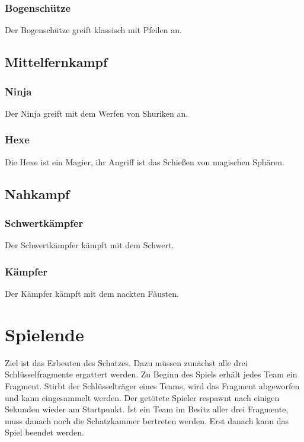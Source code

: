 \documentclass[10pt,a4paper,notitlepage]{scrreprt}
\begin{document}
\begin{flushleft}
\subsubsection{Bogenschütze}
Der Bogenschütze greift klassisch mit Pfeilen an.\\

\subsection{Mittelfernkampf}

\subsubsection{Ninja}
Der Ninja greift mit dem Werfen von Shuriken an.\\

\subsubsection{Hexe}
Die Hexe ist ein Magier, ihr Angriff ist das Schießen von magischen Sphären.\\

\subsection{Nahkampf}

\subsubsection{Schwertkämpfer}
Der Schwertkämpfer kämpft mit dem Schwert.\\

\subsubsection{Kämpfer}
Der Kämpfer kämpft mit dem nackten Fäusten.\\

\section{Spielende}
Ziel ist das Erbeuten des Schatzes. Dazu müssen zunächst alle drei Schlüsselfragmente ergattert werden. Zu Beginn des Spiels erhält jedes Team ein Fragment. Stirbt der Schlüsselträger eines Teams, wird das Fragment abgeworfen und kann eingesammelt werden. Der getötete Spieler respawnt nach einigen Sekunden wieder am Startpunkt. Ist ein Team im Besitz aller drei Fragmente, muss danach noch die Schatzkammer bertreten werden. Erst danach kann das Spiel beendet werden.\\


\end{flushleft}
\end{document}
